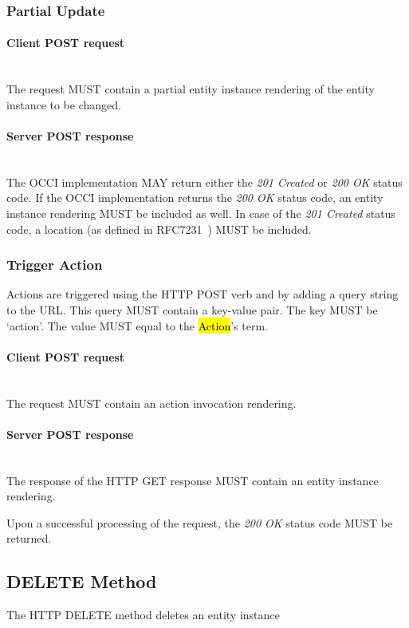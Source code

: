 \documentclass[10pt,a4paper]{article}
\begin{document}
\subsubsection{Partial Update}

\paragraph*{Client POST request}\hfill\\
The request MUST contain a partial entity instance rendering of the entity instance to be changed.

\paragraph*{Server POST response}\hfill\\
The OCCI implementation MAY return either the \emph{201 Created} or \emph{200 OK} status code. If the OCCI implementation
returns the \emph{200 OK} status code, an entity instance rendering MUST be included as well.
In case of the \emph{201 Created} status code, a location (as defined in RFC7231~\cite{rfc7231}) MUST be included.

\subsubsection{Trigger Action}
Actions are triggered using the HTTP POST verb and by adding a query string to the URL. This query MUST contain
a key-value pair. The key MUST be `action'. The value MUST equal to the \hl{Action}'s term.

\paragraph*{Client POST request}\hfill\\
The request MUST contain an action invocation rendering.

\paragraph*{Server POST response}\hfill\\
The response of the HTTP GET response MUST contain an entity instance rendering.

Upon a successful processing of the request, the \emph{200 OK} status code MUST be returned.

\subsection{DELETE Method}
The HTTP DELETE method deletes an entity instance
\end{document}
